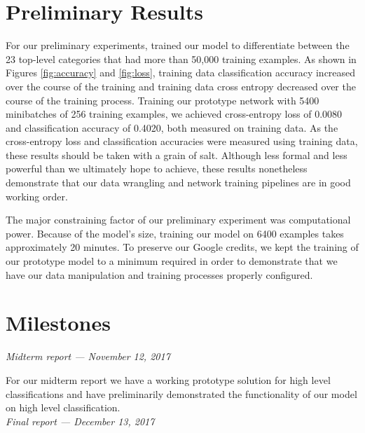 \documentclass[10pt,twocolumn,letterpaper]{article}
\begin{document}
\section{Preliminary Results}




For our preliminary experiments, trained our model to differentiate between the 23 top-level categories that had more than 50,000 training examples.
As shown in Figures \ref{fig:accuracy} and \ref{fig:loss}, training data classification accuracy increased over the course of the training and training data cross entropy decreased over the course of the training process.
Training our prototype network with 5400 minibatches of 256 training examples, we achieved cross-entropy loss of 0.0080 and classification accuracy of 0.4020, both measured on training data.
As the cross-entropy loss and classification accuracies were measured using training data, these results should be taken with a grain of salt. 
Although less formal and less powerful than we ultimately hope to achieve, these results nonetheless demonstrate that our data wrangling and network training pipelines are in good working order.

The major constraining factor of our preliminary experiment was computational power.
Because of the model's size, training our model on 6400 examples takes approximately 20 minutes.
To preserve our Google credits, we kept the training of our prototype model to a minimum required in order to demonstrate that we have our data manipulation and training processes properly configured.   
 
\section{Milestones}
 

\textit{Midterm report --- November 12, 2017}

For our midterm report we have a working prototype solution for high level classifications and have preliminarily demonstrated the functionality of our model on high level classification.
\\


\textit{Final report --- December 13, 2017}
\end{document}
